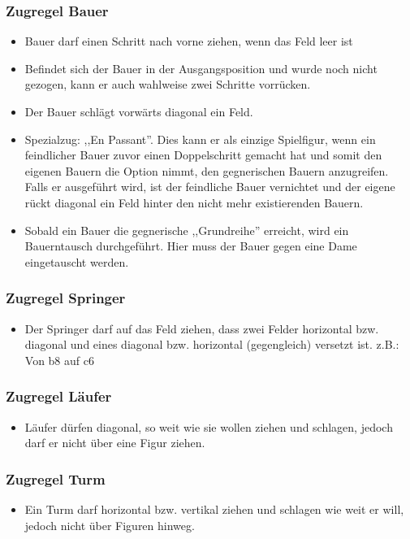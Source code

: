 \documentclass[12pt,a4paper]{article}
\begin{document}
{\subsubsection{Zugregel Bauer}
\label{SUBSUBSEC:PAWN}
\begin{itemize}
	\item{Bauer darf einen Schritt nach vorne ziehen, wenn das Feld leer ist}
	\item{Befindet sich der Bauer in der Ausgangsposition und wurde noch nicht gezogen, kann er auch wahlweise zwei Schritte vorrücken.}
	\item{Der Bauer schlägt vorwärts diagonal ein Feld.}
	\item{Spezialzug: ,,En Passant''. Dies kann er als einzige Spielfigur, wenn ein feindlicher Bauer zuvor einen Doppelschritt gemacht hat und somit den eigenen Bauern die Option nimmt, den gegnerischen Bauern anzugreifen. Falls er ausgeführt wird, ist der feindliche Bauer vernichtet und der eigene rückt diagonal ein Feld hinter den nicht mehr existierenden Bauern.}
	\item{Sobald ein Bauer die gegnerische ,,Grundreihe'' erreicht, wird ein Bauerntausch durchgeführt. Hier muss der Bauer gegen eine Dame eingetauscht werden.}
\end{itemize}

\subsubsection{Zugregel Springer}
\label{SUBSUBSEC:JUMPER}
\begin{itemize}
	\item{Der Springer darf auf das Feld ziehen, dass zwei Felder horizontal bzw. diagonal und eines diagonal bzw. horizontal (gegengleich) versetzt ist. z.B.: Von  b8 auf c6}
\end{itemize}
\subsubsection{Zugregel Läufer}
\label{SUBSUBSEC:BISHOP}
\begin{itemize}
	\item{Läufer dürfen diagonal, so weit wie sie wollen ziehen und schlagen, jedoch darf er nicht über eine Figur ziehen.}
\end{itemize}

\subsubsection{Zugregel Turm}
\label{SUBSUBSEC:ROOK}
\begin{itemize}
	\item{Ein Turm darf horizontal bzw. vertikal ziehen und schlagen wie weit er will, jedoch nicht über Figuren hinweg.}
\end{itemize}

}
\end{document}
